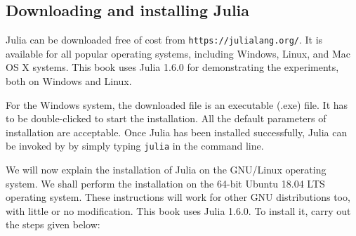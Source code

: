 
\subsection{Downloading and installing Julia} \label{julia-installation}
Julia can be downloaded free of cost from {\tt https://julialang.org/}. 
It is available for all popular operating systems, including Windows, Linux, 
and Mac OS X systems. This book uses Julia  1.6.0 for demonstrating the experiments, 
both on Windows and Linux.

For the Windows system, the downloaded file is an executable (.exe) file. It has to
be double-clicked to start the installation. All the default parameters of installation
are acceptable. Once Julia has been installed successfully, Julia can be invoked by 
by simply typing {\tt julia} in the command line. 

We will now explain the installation of Julia on the GNU/Linux operating system. 
We shall perform the installation on the 64-bit Ubuntu 18.04 LTS operating system.  
These instructions will work for other GNU distributions too, with little or 
no modification. This book uses Julia 1.6.0. To install it, carry out the steps
given below: 

